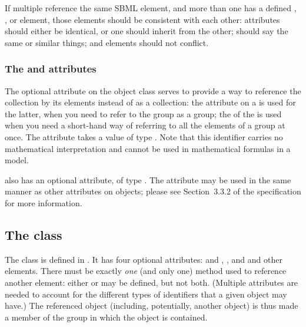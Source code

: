 If multiple \ListOfMembers {} reference the same SBML element, and more than one  has a defined , \Notes, or \Annotation element, those elements should be consistent with each other:   attributes should either be identical, or one should inherit from the other; \Notes should say the same or similar things; and \Annotation elements should not conflict.  

\begin{blockChanged}
\subsubsection{The \fixttspace{} and \fixttspace{} attributes}
\label{listofmembers-idname-attributes}

The optional  attribute on the \ListOfMembers object class serves to provide a way to reference the collection by its elements instead of as a collection:  the  attribute on a \Group is used for the latter, when you need to refer to the group as a group; the  of the \ListOfMembers is used when you need a short-hand way of referring to all the elements of a group at once.  The attribute takes a value of type .  Note that this identifier carries no mathematical interpretation and cannot be used in mathematical formulas in a model.

\ListOfMembers also has an optional  attribute, of type .  The  attribute may be used in the same manner as other  attributes on \sbmlthreecore objects; please see Section~3.3.2 of the \sbmlthreecore specification for more information.
\end{blockChanged}


\subsection{The  class}
\label{member-class}

The \Member class is defined in .  It has four optional attributes:  and , , and  and   other elements.  There must be exactly \emph{one} (and only one) method used to reference another element: either  or  may be defined, but not both.  (Multiple attributes are needed to account for the different types of identifiers that a given object may have.)  The referenced object (including, potentially, another \Group object) is thus made a member of the group in which the \Member object is contained.

